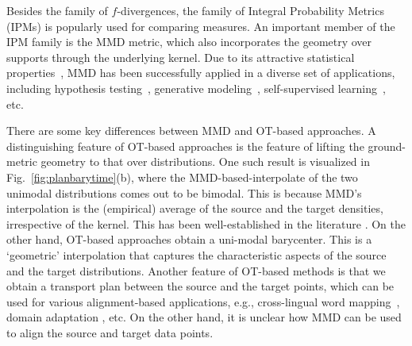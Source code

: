 Besides the family of $f$-divergences, the family of Integral Probability Metrics (IPMs) is popularly used for comparing measures. An important member of the IPM family is the MMD metric, which also incorporates the geometry over supports through the underlying kernel. Due to its attractive statistical properties~\citep{Gretton06twosample}, MMD has been successfully applied in a diverse set of applications, including hypothesis testing~\citep{gretton12a}, generative modeling~\citep{Li17}, self-supervised learning~\citep{Li21}, etc. 

There are some key differences between MMD and OT-based approaches. 
A distinguishing feature of OT-based approaches is the feature of lifting the ground-metric geometry to that over distributions. 
One such result is visualized in Fig.~\ref{fig:planbarytime}(b), where the MMD-based-interpolate of the two unimodal distributions comes out to be bimodal. This is because MMD's interpolation is the (empirical) average of the source and the target densities, irrespective of the kernel. This has been well-established in the literature \citep{bottou2017geometrical}. On the other hand, OT-based approaches obtain a uni-modal barycenter. This is a `geometric' interpolation that captures the characteristic aspects of the source and the target distributions. 
Another feature of OT-based methods is that we obtain a transport plan between the source and the target points, which can be used for various alignment-based applications, e.g., cross-lingual word mapping~\citep{alvarez18wordEmb}, domain adaptation \citep{courty17b,Courty17domAda}, etc. On the other hand, it is unclear how MMD can be used to align the source and target data points.

